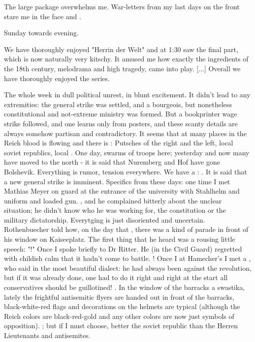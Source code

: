 \documentclass{article}
\begin{document}
The large package overwhelms me. War-letters from my last days on the front stare me in
the face and .

\skipped

\date{March 20, 1920}
Sunday towards evening.

We have thoroughly enjoyed "Herrin der Welt" and at 1:30 saw the final part, which is now naturally very kitschy. It amused me how exactly the ingredients of the 18th century, melodrama and high tragedy, came into play. [...] Overall we have thoroughly enjoyed the series.

The whole week in dull political unrest, in blunt excitement. It didn't lead to any extremities: the general strike was settled, and a bourgeois, but nonetheless constitutional and not-extreme ministry was formed. But a bookprinter wage strike followed, and one learns only  from posters, and these scanty details are always somehow partisan and contradictory. It seems that at many places in the Reich blood is flowing and there is : Putsches of the right and the left, local soviet republics, local . One day, swarms of troops here; yesterday and now many have moved to the north - it is said that Nuremberg and Hof have gone Bolshevik. Everything is rumor, tension everywhere. We have a : . It is said that a new general strike is imminent. Specifics from these days: one time I met Mathias Meyer on guard at the entrance of the university with Stahlhelm and uniform and loaded gun. , and he complained bitterly about the unclear situation; he didn't know who he was working for, the constitution or the military dictatorship. Everytging is just disoriented and uncertain.
Rothenbuecher told how, on the day that , there was a kind of parade in front of his window on Kaiseeplatz. The first thing that he heard was a rousing little speech: "!"
Once I spoke briefly to Dr Ritter. He (in the Civil Guard) regretted with childish calm that it hadn't come to battle. ! Once I at Hamecher's I met a , who said in the most beautiful dialect: he had always been against the revolution, but if it was already done, one had to do it right and right at the start all conservatives shoukd be guillotined! . In the window of the barracks a swastika, lately the frightful antisemitic flyers are handed out in front of the barracks, black-white-red flags and decorations on the helmets are typical (although the Reich colors are black-red-gold and any other colors are now just symbols of opposition). ; but if I must choose, better the soviet republic than the Herren Lieutenants and antisemites.
\skipped
\end{document}
